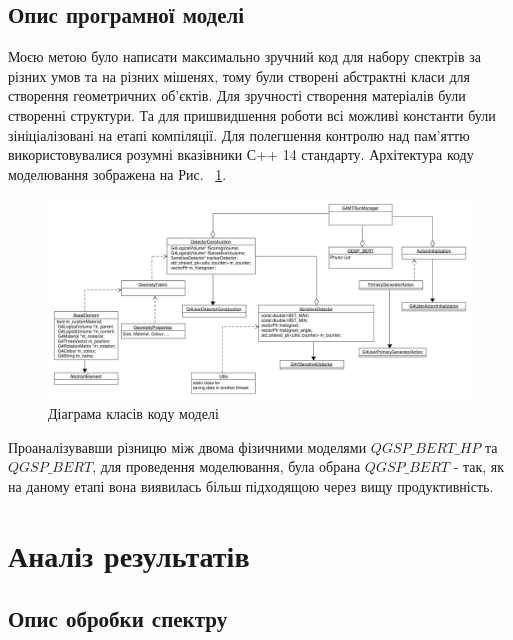 \documentclass[a4paper, 14pt]{article}
\numberwithin{equation}{section}
\numberwithin{table}{section}
\begin{document}
\subsection{Опис програмної моделі}
Моєю метою було написати максимально зручний код для набору спектрів за різних умов та на різних мішенях, тому були створені абстрактні класи для створення геометричних об'єктів. Для зручності створення матеріалів були створенні структури. 
Та для пришвидшення роботи всі можливі константи були зініціалізовані на етапі компіляції. Для полегшення контролю над пам'яттю використовувалися розумні вказівники С++ 14 стандарту. Архітектура коду моделювання зображена на Рис. ~\ref{ris:s_classDiagram}.
\begin{figure}[hbt!]
	\centering \includegraphics[width=1\textwidth]{res/classDiagram.pdf}
	\caption{Діаграма класів коду моделі} 
	\label{ris:s_classDiagram}	
\end{figure} 

Проаналізувавши різницю між двома фізичними моделями \newline $QGSP\_BERT\_HP$ та $QGSP\_BERT$, для проведення моделювання, була обрана $QGSP\_BERT$ - так, як на даному етапі вона виявилась більш підходящою через вищу продуктивність.
\newpage 
\section{Аналіз результатів}
\setcounter{figure}{0}
\subsection{Опис обробки спектру}
\end{document}
